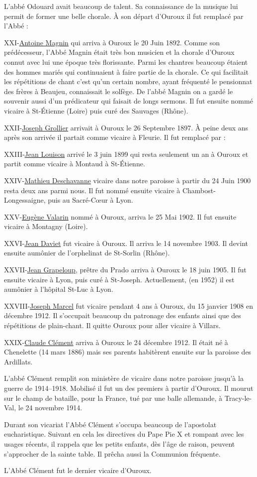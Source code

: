 L'abbé Odouard avait beaucoup de talent. Sa connaissance de la musique lui permit de former une belle chorale. À son départ d'Ouroux il fut remplacé par l'Abbé :

XXI-\underline{Antoine Magnin} qui arriva à Ouroux le 20 Juin 1892. Comme son prédécesseur, l'Abbé Magnin était très bon musicien et la chorale d'Ouroux connut avec lui une époque très florissante. Parmi les chantres beaucoup étaient des hommes mariés qui continuaient à faire partie de la chorale. Ce qui facilitait les répétitions de chant c'est qu'un certain nombre, ayant fréquenté le pensionnat des frères à Beaujeu, connaissait le solfège. De l'abbé Magnin on a gardé le souvenir aussi d'un prédicateur qui faisait de longs sermons. Il fut ensuite nommé vicaire à St-Étienne (Loire) puis curé des Sauvages (Rhône).

XXII-\underline{Joseph Grollier} arrivait à Ouroux le 26 Septembre 1897. À peine deux ans après son arrivée il partait comme vicaire à Fleurie. Il fut remplacé par :

XXIII-\underline{Jean Louison} arrivé le 3 juin 1899 qui resta seulement un an à Ouroux et partit comme vicaire à Montaud à St-Étienne.

XXIV-\underline{Mathieu Deschavanne} vicaire dans notre paroisse à partir du 24 Juin 1900 resta deux ans parmi nous. Il fut nommé ensuite vicaire
à Chambost-Longessaigne, puis au Sacré-Cœur à Lyon.

XXV-\underline{Eugène Valarin} nommé à Ouroux, arriva le 25 Mai 1902. Il fut ensuite vicaire à Montagny (Loire).

XXVI-\underline{Jean Daviet} fut vicaire à Ouroux. Il arriva le 14 novembre 1903. Il devint ensuite aumônier de l'orphelinat de St-Sorlin (Rhône).

XXVII-\underline{Jean Grapeloup}, prêtre du Prado arriva à Ouroux le 18 juin 1905. Il fut ensuite vicaire à Lyon, puis curé à St-Joseph. Actuellement, (en 1952) il est aumônier à l'hôpital St-Luc à Lyon.

XXVIII-\underline{Joseph Marcel} fut vicaire pendant 4 ans à Ouroux, du 15 janvier 1908 en décembre 1912. Il s'occupait beaucoup du patronage des enfants ainsi que des répétitions de plain-chant. Il quitte Ouroux pour aller vicaire à Villars.

XXIX-\underline{Claude Clément} arriva à Ouroux le 24 décembre 1912. Il était né à Chenelette (14 mars 1886) mais ses parents habitèrent ensuite sur la paroisse des Ardillats.

L'abbé Clément remplit son ministère de vicaire dans notre paroisse jusqu'à la guerre de 1914--1918. Mobilisé il fut un des premiers à partir d'Ouroux. Il mourut sur le champ de bataille, pour la France, tué par une balle allemande, à Tracy-le-Val, le 24 novembre 1914.

Durant son vicariat l'Abbé Clément s'occupa beaucoup de l'apostolat eucharistique. Suivant en cela les directives du Pape Pie X et rompant avec les usages récents, il rappela que les petits enfants, dès l'âge de raison, peuvent s'approcher de la sainte table. Il prêcha aussi la Communion fréquente.

L'Abbé Clément fut le dernier vicaire d'Ouroux.
